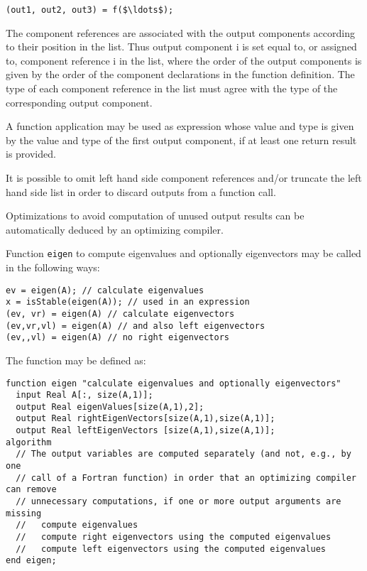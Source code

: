 \lstinline!(out1, out2, out3) = f($\ldots$);!

The component references are associated with the output components
according to their position in the list. Thus output component i is set
equal to, or assigned to, component reference i in the list, where the
order of the output components is given by the order of the component
declarations in the function definition. The type of each component
reference in the list must agree with the type of the corresponding
output component.

A function application may be used as expression whose value and type is
given by the value and type of the first output component, if at least
one return result is provided.

It is possible to omit left hand side component references and/or
truncate the left hand side list in order to discard outputs from a
function call.

\begin{nonnormative}
Optimizations to avoid computation of unused output results can
be automatically deduced by an optimizing compiler.
\end{nonnormative}

\begin{example}
Function \lstinline!eigen! to compute eigenvalues and optionally
eigenvectors may be called in the following ways:
\begin{lstlisting}[language=modelica]
ev = eigen(A); // calculate eigenvalues
x = isStable(eigen(A)); // used in an expression
(ev, vr) = eigen(A) // calculate eigenvectors
(ev,vr,vl) = eigen(A) // and also left eigenvectors
(ev,,vl) = eigen(A) // no right eigenvectors
\end{lstlisting}
The function may be defined as:
\begin{lstlisting}[language=modelica]
function eigen "calculate eigenvalues and optionally eigenvectors"
  input Real A[:, size(A,1)];
  output Real eigenValues[size(A,1),2];
  output Real rightEigenVectors[size(A,1),size(A,1)];
  output Real leftEigenVectors [size(A,1),size(A,1)];
algorithm
  // The output variables are computed separately (and not, e.g., by one
  // call of a Fortran function) in order that an optimizing compiler can remove
  // unnecessary computations, if one or more output arguments are missing
  //   compute eigenvalues
  //   compute right eigenvectors using the computed eigenvalues
  //   compute left eigenvectors using the computed eigenvalues
end eigen;
\end{lstlisting}
\end{example}

